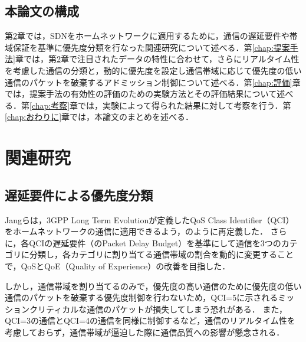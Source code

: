 \documentclass[a4paper,11pt,uplatex]{ujreport}
\begin{document}
\section{本論文の構成}
\label{sec:本論文の構成}

  第\ref{chap:関連研究}章では，SDNをホームネットワークに適用するために，通信の遅延要件や帯域保証を基準に優先度分類を行なった関連研究について述べる．第\ref{chap:提案手法}章では，第\ref{chap:関連研究}章で注目されたデータの特性に合わせて，さらにリアルタイム性を考慮した通信の分類と，動的に優先度を設定し通信帯域に応じて優先度の低い通信のパケットを破棄するアドミッション制御について述べる．第\ref{chap:評価}章では，提案手法の有効性の評価のための実験方法とその評価結果について述べる．第\ref{chap:考察}章では，実験によって得られた結果に対して考察を行う．第\ref{chap:おわりに}章では，本論文のまとめを述べる．


\chapter{関連研究}
\label{chap:関連研究}

\section{遅延要件による優先度分類}
\label{sec:遅延要件による優先度分類}

  Jangらは，3GPP Long Term Evolutionが定義したQoS Class Identifier（QCI）をホームネットワークの通信に適用できるよう，のように再定義した\cite{Framework}．
  さらに，各QCIの遅延要件（のPacket Delay Budget）を基準にして通信を3つのカテゴリに分類し，各カテゴリに割り当てる通信帯域の割合を動的に変更することで，QoSとQoE（Quality of Experience）の改善を目指した\cite{Framework2}．\par
  しかし，通信帯域を割り当てるのみで，優先度の高い通信のために優先度の低い通信のパケットを破棄する優先度制御を行わないため，QCI=5に示されるミッションクリティカルな通信のパケットが損失してしまう恐れがある．
  また，QCI=3の通信とQCI=4の通信を同様に制御するなど，通信のリアルタイム性を考慮しておらず，通信帯域が逼迫した際に通信品質への影響が懸念される．

\end{document}
